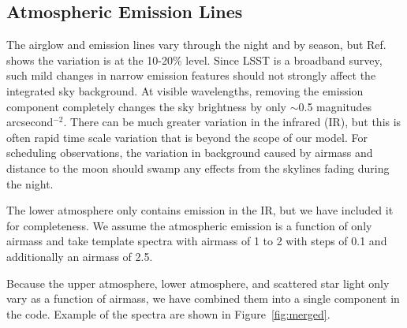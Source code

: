 \documentclass[]{spie}
\begin{document}
\subsection{Atmospheric Emission Lines}

The airglow and emission lines vary through the night and by season, but Ref.~ shows the variation is at the 10-20\% level.  Since LSST is a broadband survey, such mild changes in narrow emission features should not strongly affect the integrated sky background. At visible wavelengths, removing the emission component completely changes the sky brightness by only $\sim$0.5 magnitudes arcsecond$^{-2}$.  There can be much greater variation in the infrared (IR), but this is often rapid time scale variation that is beyond the scope of our model.  For scheduling observations, the variation in background caused by airmass and distance to the moon should swamp any effects from the skylines fading during the night.

The lower atmosphere only contains emission in the IR, but we have included it for completeness.  We assume the atmospheric emission is a function of only airmass and take template spectra with airmass of 1 to 2 with steps of 0.1 and additionally an airmass of 2.5.

Because the upper atmosphere, lower atmosphere, and scattered star light only vary as a function of airmass, we have combined them into a single component in the code. Example of the spectra are shown in Figure~\ref{fig:merged}.
\end{document}
